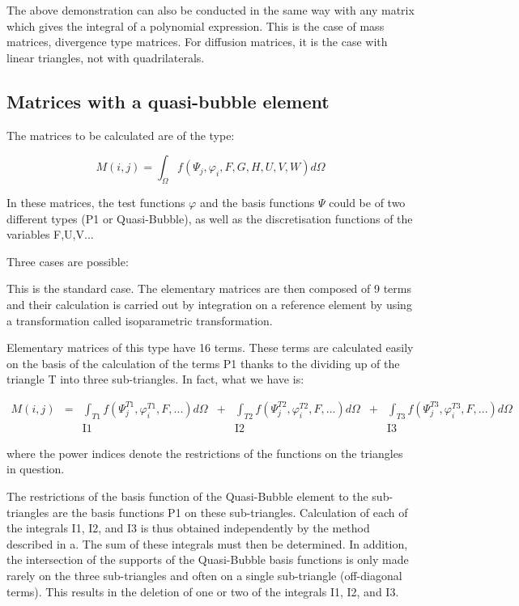 The above demonstration can also be conducted in the same way with any matrix
which gives the integral of a polynomial expression. This is the case of mass
matrices, divergence type matrices. For diffusion matrices, it is the case with
linear triangles, not with quadrilaterals.

\subsection{Matrices with a quasi-bubble element}

The matrices to be calculated are of the type:


\[M(i,j)=\int _{\Omega }f(\Psi _{j} ,\varphi _{i} ,F,G,H,U,V,W)d\Omega  \]

In these matrices, the test functions $\varphi$ and the basis functions $\Psi$
could be of two different types (P1 or Quasi-Bubble), as well as the
discretisation functions of the variables F,U,V...

Three cases are possible:


This is the standard case. The elementary matrices are then composed of 9 terms
and their calculation is carried out by integration on a reference element by
using a transformation called isoparametric transformation.


Elementary matrices of this type have 16 terms. These terms are calculated
easily on the basis of the calculation of the terms P1 thanks to the dividing
up of the triangle T into three sub-triangles. In fact, what we have is:

\[
\begin{array}{ccccccc}
M(i,j) & = & \int _{T1}f(\Psi _{j}^{T1} ,\varphi _{i}^{T1} ,F,...)d\Omega & + & \int _{T2}f(\Psi _{j}^{T2} ,\varphi _{i}^{T2} ,F,...)d\Omega & + & \int _{T3}f(\Psi _{j}^{T3} ,\varphi _{i}^{T3} ,F,...)d\Omega \\
       &   &   \mathrm{I1}                                                         &   &    \mathrm{I2}                                                        &   &   \mathrm{I3}
\end{array}
\]

where the power indices denote the restrictions of the functions on the
triangles in question.

The restrictions of the basis function of the Quasi-Bubble element to the
sub-triangles are the basis functions P1 on these sub-triangles. Calculation of
each of the integrals I1, I2, and I3 is thus obtained independently by the
method described in a. The sum of these integrals must then be determined. In
addition, the intersection of the supports of the Quasi-Bubble basis functions
is only made rarely on the three sub-triangles and often on a single
sub-triangle (off-diagonal terms). This results in the deletion of one or two
of the integrals I1, I2, and I3.

